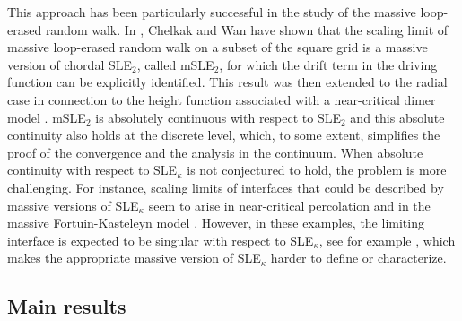 \documentclass{article}
\theoremstyle{definition}
\theoremstyle{remark}
\theoremstyle{remark}
\begin{document}
This approach has been particularly successful in the study of the massive loop-erased random walk. In \cite{mLERW}, Chelkak and Wan have shown that the scaling limit of massive loop-erased random walk on a subset of the square grid is a massive version of chordal SLE$_2$, called mSLE$_2$, for which the drift term in the driving function can be explicitly identified. This result was then extended to the radial case in connection to the height function associated with a near-critical dimer model \cite{off_dimers}. mSLE$_2$ is absolutely continuous with respect to SLE$_2$ and this absolute continuity also holds at the discrete level, which, to some extent, simplifies the proof of the convergence and the analysis in the continuum. When absolute continuity with respect to SLE$_{\kappa}$ is not conjectured to hold, the problem is more challenging. For instance, scaling limits of interfaces that could be described by massive versions of SLE$_\kappa$ seem to arise in near-critical percolation \cite{near_percolation} and in the massive Fortuin-Kasteleyn model \cite{massive_FK}. However, in these examples, the limiting interface is expected to be singular with respect to SLE$_\kappa$, see for example \cite{Nolin}, which makes the appropriate massive version of SLE$_\kappa$ harder to define or characterize.

\subsection{Main results}
\end{document}
